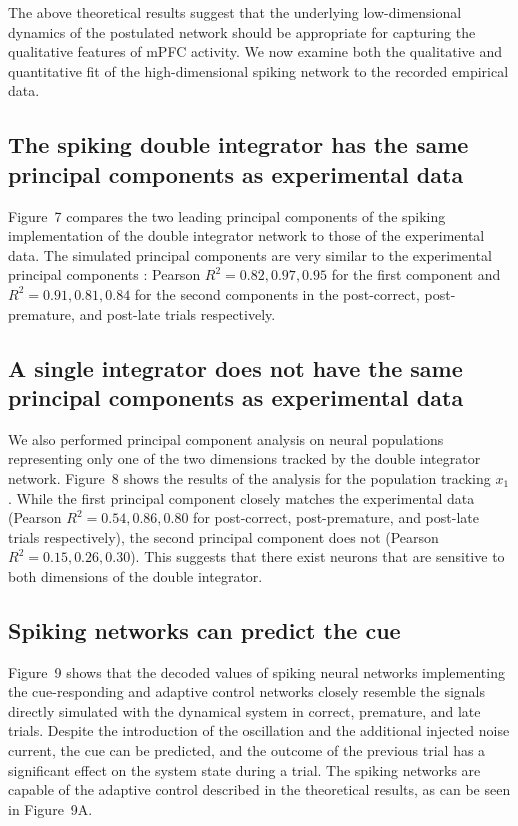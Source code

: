 \documentclass[11pt]{article}
\begin{document}
The above theoretical results suggest that
the underlying low-dimensional dynamics
of the postulated network
should be appropriate
for capturing the qualitative features of mPFC activity.
We now examine
both the qualitative and quantitative fit
of the high-dimensional spiking network
to the recorded empirical data.

\subsection{The spiking double integrator has the same principal components as experimental data}

Figure~7 compares
the two leading principal components
of the spiking implementation of the double integrator network
to those of the experimental data.
The simulated principal components
are very similar to the experimental principal components
\cite{Narayanan2009}:
Pearson $R^2 = 0.82, 0.97, 0.95$
for the first component
and $R^2 = 0.91, 0.81, 0.84$
for the second components in
the post-correct, post-premature,
and post-late trials respectively.

\subsection{A single integrator does not have the same principal components as experimental data}

We also performed principal component analysis
on neural populations representing only one
of the two dimensions tracked by
the double integrator network.
Figure~8
shows the results of the analysis
for the population tracking $x_1$.
While the first principal component
closely matches the experimental data
(Pearson $R^2 = 0.54, 0.86, 0.80$
for post-correct, post-premature, and post-late
trials respectively),
the second principal component
does not (Pearson $R^2 = 0.15, 0.26, 0.30$).
This suggests that there exist
neurons that are sensitive
to both dimensions of the double integrator.

\subsection{Spiking networks can predict the cue}

Figure~9 shows that
the decoded values of spiking neural networks
implementing the cue-responding
and adaptive control networks
closely resemble the signals
directly simulated with
the dynamical system
in correct, premature, and late trials.
Despite the introduction of the oscillation
and the additional injected noise current,
the cue can be predicted,
and the outcome of the previous trial
has a significant effect
on the system state during a trial.
The spiking networks are capable
of the adaptive control described
in the theoretical results,
as can be seen in Figure~9A.
\end{document}
